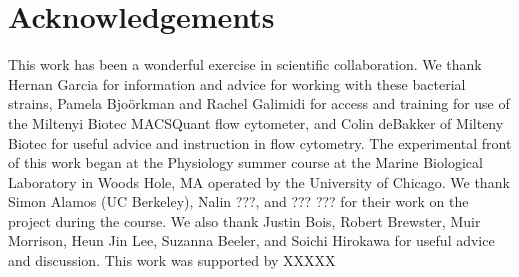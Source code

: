 \section*{Acknowledgements }

This work has been a wonderful exercise in scientific collaboration. We thank
Hernan Garcia for information and advice for working with these bacterial
strains, Pamela Bjo\"{o}rkman and Rachel Galimidi for access and training for
use of the Miltenyi Biotec MACSQuant flow cytometer, and Colin deBakker of
Milteny Biotec for useful advice and instruction in flow cytometry. The
experimental front of this work began at the Physiology summer course at the
Marine Biological Laboratory in Woods Hole, MA operated by the University of
Chicago. We thank Simon Alamos (UC Berkeley), Nalin ???, and ??? ??? for their
work on the project during the course. We also thank Justin Bois, Robert
Brewster, Muir Morrison, Heun Jin Lee, Suzanna Beeler, and Soichi Hirokawa for
useful advice and discussion. This work was supported by XXXXX
